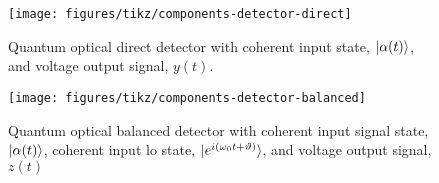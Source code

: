 

\begin{figure}[htb]
    \centering
    \texttt{[image: figures/tikz/components-detector-direct]}
    \caption{Quantum optical direct detector with coherent input state, $\lvert\alpha(t)\rangle$, and voltage output signal, $y(t)$.}\label{fig:components_detector_direct}
\end{figure}

\begin{figure}[htb]
    \centering
    \texttt{[image: figures/tikz/components-detector-balanced]}
    \caption{Quantum optical balanced detector with coherent input signal state, $\lvert\alpha(t)\rangle$, coherent input \gls{lo} state, $\lvert e^{i(\omega_0t+\vartheta)}\rangle$, and voltage output signal, $z(t)$}\label{fig:components_detector_balanced}
\end{figure}
